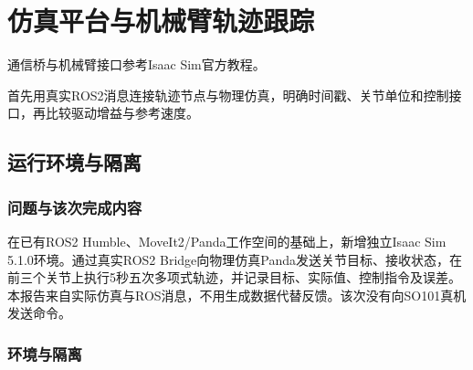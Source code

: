 \chapter{仿真平台与机械臂轨迹跟踪}
通信桥与机械臂接口参考Isaac Sim官方教程\cite{isaac}。


首先用真实ROS2消息连接轨迹节点与物理仿真，明确时间戳、关节单位和控制接口，再比较驱动增益与参考速度。

\section{运行环境与隔离}

\label{stage:s01}

\subsection{问题与该次完成内容}\label{s01-detail-1}

在已有ROS2 Humble、MoveIt2/Panda工作空间的基础上，新增独立Isaac Sim 5.1.0环境。通过真实ROS2 Bridge向物理仿真Panda发送关节目标、接收状态，在前三个关节上执行5秒五次多项式轨迹，并记录目标、实际值、控制指令及误差。本报告来自实际仿真与ROS消息，不用生成数据代替反馈。该次没有向SO101真机发送命令。

\subsection{环境与隔离}\label{s01-detail-2}

